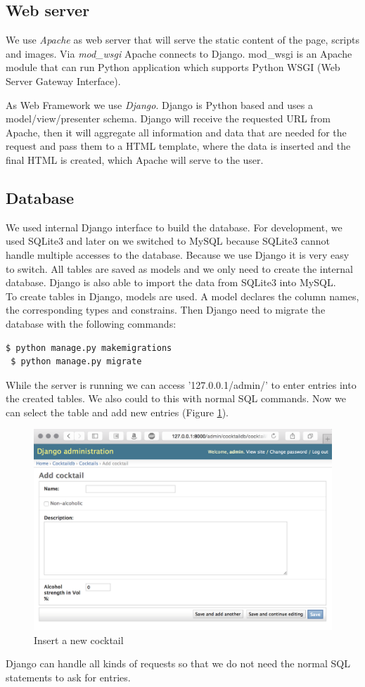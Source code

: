 \documentclass{acm_proc_article-sp}
\begin{document}
\subsection{Web server}\label{sec:web server}
We use \textit{Apache} as web server that will serve the static content of the page, scripts and images. Via \textit{mod\_wsgi} Apache connects to Django. mod\_wsgi is an Apache module that can run Python application which supports Python WSGI (Web Server Gateway Interface).

As Web Framework we use \textit{Django}. Django is Python based and uses a model/view/presenter schema. Django will receive the requested URL from Apache, then it will aggregate all information and data that are needed for the request and pass them to a HTML template, where the data is inserted and the final HTML is created, which Apache will serve to the user.



\subsection{Database}
We used internal Django interface to build the database. For development, we used SQLite3 and later on we switched to MySQL because SQLite3 cannot handle multiple accesses to the database. Because we use Django it is very easy to switch. All tables are saved as models and we only need to create the internal database. Django is also able to import the data from SQLite3 into MySQL. \\
To create tables in Django, models are used. A model declares the column names, the corresponding types and constrains. Then Django need to migrate the database with the following commands:
\begin{lstlisting}[language=bash]
 $ python manage.py makemigrations
 $ python manage.py migrate
\end{lstlisting}
While the server is running we can access '127.0.0.1/admin/' to enter entries into the created tables. We also could to this with normal SQL commands. Now we can select the table and add new entries (Figure \ref{fig:db_entry}). \\
\begin{figure}[htbp] 
 \centering
    \includegraphics[width=0.8\linewidth]{pictures/db_insert_entry.png}
 \caption{Insert a new cocktail}
 \label{fig:db_entry}
\end{figure}
Django can handle all kinds of requests so that we do not need the normal SQL statements to ask for entries.
\end{document}
